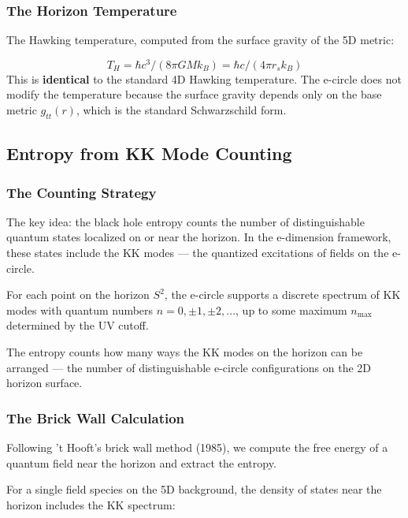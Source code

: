 \documentclass[aps,prd,preprint,superscriptaddress,longbibliography,floatfix]{revtex4-2}
\theoremstyle{remark}
\begin{document}
\subsubsection{The Horizon Temperature}

The Hawking temperature, computed from the surface gravity of the 5D metric:


\begin{equation}
    T_H = \hbar c^{3}/(8\pi GMk_B) = \hbar c/(4\pi r_s k_B)
\end{equation}
This is \textbf{identical} to the standard 4D Hawking temperature. The e-circle does not modify the temperature because the surface gravity depends only on the base metric $g_{tt}(r)$, which is the standard Schwarzschild form.



\subsection{Entropy from KK Mode Counting}


\subsubsection{The Counting Strategy}

The key idea: the black hole entropy counts the number of distinguishable quantum states localized on or near the horizon. In the e-dimension framework, these states include the KK modes --- the quantized excitations of fields on the e-circle.

For each point on the horizon $S^{2}$, the e-circle supports a discrete spectrum of KK modes with quantum numbers $n = 0, \pm1, \pm2, ...$, up to some maximum $n_{\max}$ determined by the UV cutoff.

The entropy counts how many ways the KK modes on the horizon can be arranged --- the number of distinguishable e-circle configurations on the 2D horizon surface.


\subsubsection{The Brick Wall Calculation}

Following 't Hooft's brick wall method (1985), we compute the free energy of a quantum field near the horizon and extract the entropy.

For a single field species on the 5D background, the density of states near the horizon includes the KK spectrum:
\end{document}
